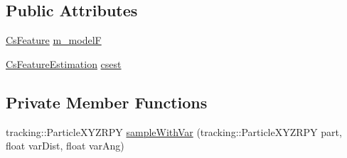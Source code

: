 \subsection*{\-Public \-Attributes}
\begin{DoxyCompactItemize}
\item 
\hyperlink{class_cs_feature}{\-Cs\-Feature} \hyperlink{class_particlepose_a4d0304244af04da649472549e3a57f05}{m\-\_\-model\-F}
\item 
\hyperlink{class_cs_feature_estimation}{\-Cs\-Feature\-Estimation} \hyperlink{class_particlepose_af41bfccd67a035c391b1e4655d66f631}{csest}
\end{DoxyCompactItemize}
\subsection*{\-Private \-Member \-Functions}
\begin{DoxyCompactItemize}
\item 
tracking\-::\-Particle\-X\-Y\-Z\-R\-P\-Y \hyperlink{class_particlepose_a248a7f70bff04020c78dca31c3d35053}{sample\-With\-Var} (tracking\-::\-Particle\-X\-Y\-Z\-R\-P\-Y part, float var\-Dist, float var\-Ang)
\end{DoxyCompactItemize}

